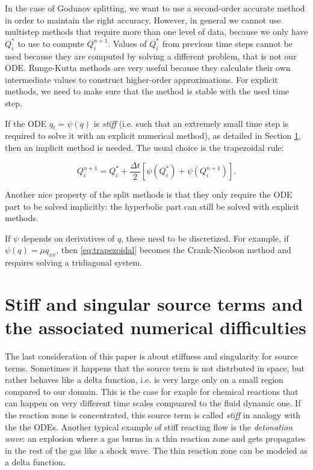 \documentclass[journal,onecolumn]{IEEEtran}
\begin{document}
In the case of Godunov splitting, we want to use a second-order accurate method in order to maintain the right accuracy. However, in general we cannot use multistep methods that require more than one level of data, because we only have $Q_i^*$ to use to compute $Q_i^{n+1}$. Values of $Q_i^*$ from previous time steps cannot be used because they are computed by solving a different problem, that is not our ODE. Runge-Kutta methods are very useful because they calculate their own intermediate values to construct higher-order approximations. For explicit methods, we need to make sure that the method is stable with the used time step.

\hfill

If the ODE $q_t=\psi(q)$ is \textit{stiff} (i.e. such that an extremely small time step is required to solve it with an explicit numerical method), as detailed in Section \ref{stiff}, then an implicit method is needed. The usual choice is the trapezoidal rule:

\begin{equation}\label{eq:trapezoidal}
	Q_i^{n+1} = Q_i^*+\frac{\Delta t}{2}[\psi(Q_i^*)+\psi(Q_i^{n+1})].
\end{equation}

Another nice property of the split methods is that they only require the ODE part to be solved implicitly: the hyperbolic part can still be solved with explicit methods.

If $\psi$ depends on derivatives of $q$, these need to be discretized. For example, if $\psi(q)=\mu q_{xx}$, then \eqref{eq:trapezoidal} becomes the Crank-Nicolson method and requires solving a tridiagonal system.

\section{Stiff and singular source terms and the associated numerical difficulties} \label{stiff}

The last consideration of this paper is about stiffness and singularity for source terms. Sometimes it happens that the source term is not distrbuted in space, but rather behaves like a delta function, i.e. is very large only on a small region compared to our domain. This is the case for exaple for chemical reactions that can happen on very different time scales compuared to the fluid dynamic one. If the reaction zone is concentrated, this source term is called \textit{stiff} in analogy with the the ODEs. Another typical example of stiff reacting flow is the \textit{detonation wave}: an explosion where a gas burns in a thin reaction zone and gets propagates in the rest of the gas like a shock wave. The thin reaction zone can be modeled as a delta function.
\end{document}
